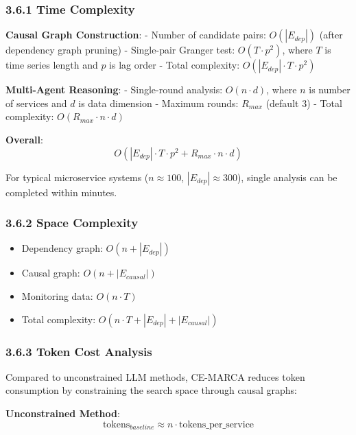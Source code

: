 \hypertarget{time-complexity}{%
\subsubsection{3.6.1 Time Complexity}\label{time-complexity}}

\textbf{Causal Graph Construction}: - Number of candidate pairs:
\(O(|E_{dep}|)\) (after dependency graph pruning) - Single-pair Granger
test: \(O(T \cdot p^2)\), where \(T\) is time series length and \(p\) is
lag order - Total complexity: \(O(|E_{dep}| \cdot T \cdot p^2)\)

\textbf{Multi-Agent Reasoning}: - Single-round analysis:
\(O(n \cdot d)\), where \(n\) is number of services and \(d\) is data
dimension - Maximum rounds: \(R_{max}\) (default 3) - Total complexity:
\(O(R_{max} \cdot n \cdot d)\)

\textbf{Overall}:
\[O(|E_{dep}| \cdot T \cdot p^2 + R_{max} \cdot n \cdot d)\]

For typical microservice systems (\(n \approx 100\),
\(|E_{dep}| \approx 300\)), single analysis can be completed within
minutes.

\hypertarget{space-complexity}{%
\subsubsection{3.6.2 Space Complexity}\label{space-complexity}}

\begin{itemize}
\tightlist
\item
  Dependency graph: \(O(n + |E_{dep}|)\)
\item
  Causal graph: \(O(n + |E_{causal}|)\)
\item
  Monitoring data: \(O(n \cdot T)\)
\item
  Total complexity: \(O(n \cdot T + |E_{dep}| + |E_{causal}|)\)
\end{itemize}

\hypertarget{token-cost-analysis}{%
\subsubsection{3.6.3 Token Cost Analysis}\label{token-cost-analysis}}

Compared to unconstrained LLM methods, CE-MARCA reduces token
consumption by constraining the search space through causal graphs:

\textbf{Unconstrained Method}:
\[\text{tokens}_{baseline} \approx n \cdot \text{tokens\_per\_service}\]


